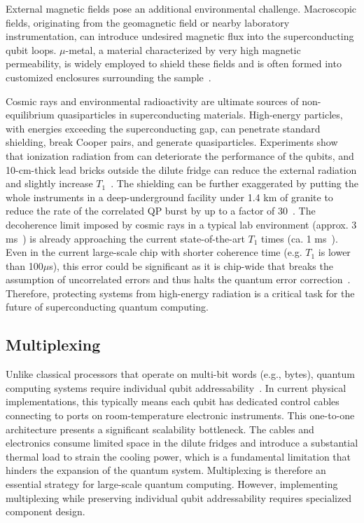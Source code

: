 \documentclass[a4paper,onecolumn,11pt,unpublished]{quantumarticle}
\begin{document}
External magnetic fields pose an additional environmental challenge. Macroscopic fields, originating from the geomagnetic field or nearby laboratory instrumentation, can introduce undesired magnetic flux into the superconducting qubit loops. $\mu$-metal, a material characterized by very high magnetic permeability, is widely employed to shield these fields and is often formed into customized enclosures surrounding the sample~\cite{Nguyen2020Toward,Bao2022Fluxonium,Zhang2021Universal}.

Cosmic rays and environmental radioactivity are ultimate sources of non-equilibrium quasiparticles in superconducting materials. High-energy particles, with energies exceeding the superconducting gap, can penetrate standard shielding, break Cooper pairs, and generate quasiparticles. Experiments show that ionization radiation from  can deteriorate the performance of the qubits, and 10-cm-thick lead bricks outside the dilute fridge can reduce the external radiation and slightly increase $T_1$~\cite{Vepsalainen2020Impact}. The shielding can be further exaggerated by putting the whole instruments in a deep-underground facility under 1.4 km of granite to reduce the rate of the correlated QP burst by up to a factor of 30~\cite{Cardani2021Reducing}.  The decoherence limit imposed by cosmic rays in a typical lab environment (approx. 3 ms~\cite{Vepsalainen2020Impact}) is already approaching the current state-of-the-art $T_1$ times (ca. 1 ms~\cite{Somoroff2023Millisecond}). Even in the current large-scale chip with shorter coherence time (e.g. $T_1$ is lower than 100$\mu$s), this error could be significant as it is chip-wide that breaks the assumption of uncorrelated errors and thus halts the quantum error correction~\cite{McEwen2022Resolving}. Therefore, protecting systems from high-energy radiation is a critical task for the future of superconducting quantum computing.

\subsection{Multiplexing}
Unlike classical processors that operate on multi-bit words (e.g., bytes), quantum computing systems require individual qubit addressability~\cite{Krantz2019A}. In current physical implementations, this typically means each qubit has dedicated control cables connecting to ports on room-temperature electronic instruments. This one-to-one architecture presents a significant scalability bottleneck. The cables and electronics consume limited space in the dilute fridges and introduce a substantial thermal load to strain the cooling power, which is a fundamental limitation that hinders the expansion of the quantum system. Multiplexing is therefore an essential strategy for large-scale quantum computing. However, implementing multiplexing while preserving individual qubit addressability requires specialized component design.
\end{document}
